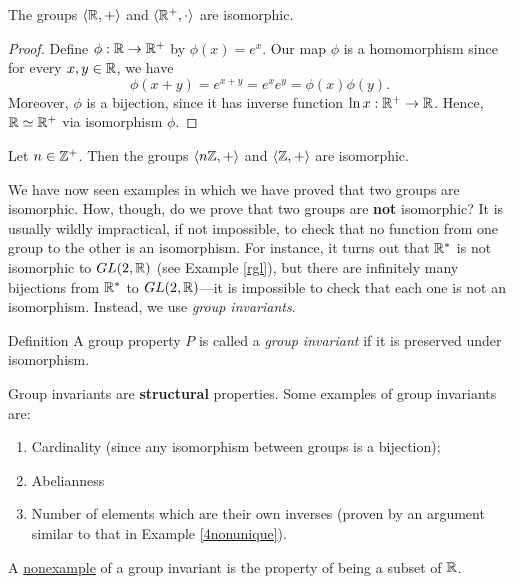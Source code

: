 \begin{example}{} The groups $\langle\mathbb{R},+\rangle$ and $\langle\mathbb{R}^+, \cdot\rangle$ are isomorphic.  %

\begin{proof}  Define $\phi:\mathbb{R}\to \mathbb{R}^+$ by $\phi(x)=e^x$.  Our map
$\phi$ is a homomorphism since for every $x,y\in \mathbb{R}$, we have
$$\phi(x+y)=e^{x+y}=e^xe^y=\phi(x)\phi(y).$$ Moreover, $\phi$ is a
bijection, since it has inverse function $\ln x: \mathbb{R}^+\to \mathbb{R}$.
Hence, $\mathbb{R} \simeq \mathbb{R}^+$ via isomorphism $\phi$.\end{proof} \end{example}


\begin{example}{} Let $n\in \mathbb{Z}^+$.  Then the groups $\langle n\mathbb{Z},+\rangle$ and $\langle\mathbb{Z},+\rangle$ are isomorphic.   \end{example}

We have now seen examples in which we have proved that two groups
are isomorphic. How, though, do we prove that two groups are \textbf{not} isomorphic?  It is usually wildly impractical, if not
impossible, to check that no function from one group to the other is
an isomorphism. For instance, it turns out that $\mathbb{R}^*$ is not
isomorphic to $GL(2,\mathbb{R})$ (see Example \ref{rgl}), but there are
infinitely many bijections from $\mathbb{R}^*$ to $GL(2,\mathbb{R})$---it is
impossible to check that each one is not an isomorphism. Instead, we
use \textit{group invariants}.

\begin{df}{Definition} A group property $P$ is called a \textit{group invariant}
if it is preserved under isomorphism.\end{df}

 Group invariants are \textbf{structural} properties. Some examples of group invariants are:
\begin{enumerate}
\item Cardinality (since any isomorphism between groups is a bijection);
\item Abelianness 
\item Number of elements which are their own inverses (proven by an argument similar to that in Example \ref{4nonunique}).
\end{enumerate}

 A \underline{nonexample} of a group invariant is the property of being a subset of $\mathbb{R}$.


